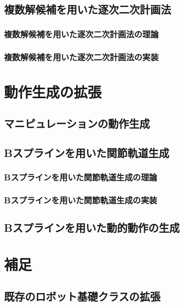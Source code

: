 \documentclass[]{jarticle}
\begin{document}
\subsection{複数解候補を用いた逐次二次計画法} \label{sec:sqp-msc}
\subsubsection{複数解候補を用いた逐次二次計画法の理論}

\subsubsection{複数解候補を用いた逐次二次計画法の実装}


\section{動作生成の拡張} \label{chap:extended}
\subsection{マニピュレーションの動作生成} \label{sec:manip}


\subsection{Bスプラインを用いた関節軌道生成} \label{sec:bspline}
\subsubsection{Bスプラインを用いた関節軌道生成の理論}

\subsubsection{Bスプラインを用いた関節軌道生成の実装}

\subsection{Bスプラインを用いた動的動作の生成} \label{sec:dynamic}


\section{補足} \label{chap:appendix}
\subsection{既存のロボット基礎クラスの拡張} \label{sec:base-extention}

\end{document}
